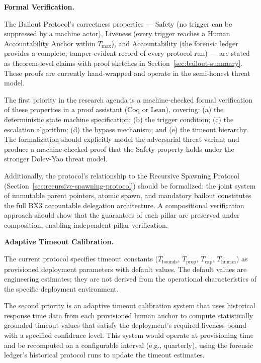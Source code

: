 \bigskip
\noindent\textbf{Formal Verification.}
\bigskip

The Bailout Protocol's correctness properties — Safety (no trigger can be suppressed by a machine actor), Liveness (every trigger reaches a Human Accountability Anchor within $T_{\max}$), and Accountability (the forensic ledger provides a complete, tamper-evident record of every protocol run) — are stated as theorem-level claims with proof sketches in Section~\ref{sec:bailout-summary}. These proofs are currently hand-wrapped and operate in the semi-honest threat model.

The first priority in the research agenda is a machine-checked formal verification of these properties in a proof assistant (Coq or Lean), covering: (a) the deterministic state machine specification; (b) the trigger condition; (c) the escalation algorithm; (d) the bypass mechanism; and (e) the timeout hierarchy. The formalization should explicitly model the adversarial threat variant and produce a machine-checked proof that the Safety property holds under the stronger Dolev-Yao threat model.

Additionally, the protocol's relationship to the Recursive Spawning Protocol (Section~\ref{sec:recursive-spawning-protocol}) should be formalized: the joint system of immutable parent pointers, atomic spawn, and mandatory bailout constitutes the full BX3 accountable delegation architecture. A compositional verification approach should show that the guarantees of each pillar are preserved under composition, enabling independent pillar verification.

\bigskip
\noindent\textbf{Adaptive Timeout Calibration.}
\bigskip

The current protocol specifies timeout constants ($T_{\text{bounds}}$, $T_{\text{prop}}$, $T_{\text{cap}}$, $T_{\text{human}}$) as provisioned deployment parameters with default values. The default values are engineering estimates; they are not derived from the operational characteristics of the specific deployment environment.

The second priority is an adaptive timeout calibration system that uses historical response time data from each provisioned human anchor to compute statistically grounded timeout values that satisfy the deployment's required liveness bound with a specified confidence level. This system would operate at provisioning time and be recomputed on a configurable interval (e.g., quarterly), using the forensic ledger's historical protocol runs to update the timeout estimates.

